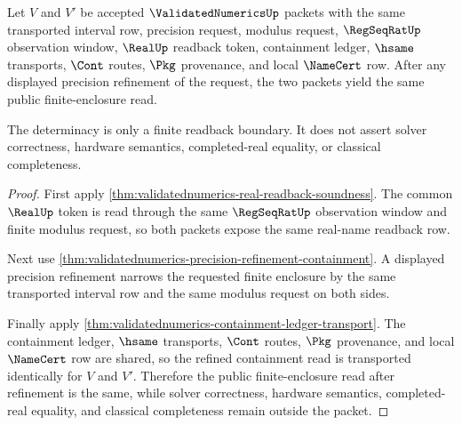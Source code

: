 \begin{theorem}
\label{thm:validatednumerics-refined-readback-containment-determinacy}
Let $V$ and $V'$ be accepted $\ValidatedNumericsUp$ packets with the same
transported interval row, precision request, modulus request, $\RegSeqRatUp$
observation window, $\RealUp$ readback token, containment ledger, $\hsame$
transports, $\Cont$ routes, $\Pkg$ provenance, and local $\NameCert$ row. After
any displayed precision refinement of the request, the two packets yield the
same public finite-enclosure read.

The determinacy is only a finite readback boundary. It does not assert solver
correctness, hardware semantics, completed-real equality, or classical
completeness.
\end{theorem}
\begin{proof}
First apply \autoref{thm:validatednumerics-real-readback-soundness}. The
common $\RealUp$ token is read through the same $\RegSeqRatUp$ observation
window and finite modulus request, so both packets expose the same real-name
readback row.

Next use \autoref{thm:validatednumerics-precision-refinement-containment}. A
displayed precision refinement narrows the requested finite enclosure by the
same transported interval row and the same modulus request on both sides.

Finally apply \autoref{thm:validatednumerics-containment-ledger-transport}.
The containment ledger, $\hsame$ transports, $\Cont$ routes, $\Pkg$ provenance,
and local $\NameCert$ row are shared, so the refined containment read is
transported identically for $V$ and $V'$. Therefore the public finite-enclosure
read after refinement is the same, while solver correctness, hardware
semantics, completed-real equality, and classical completeness remain outside
the packet.
\end{proof}

